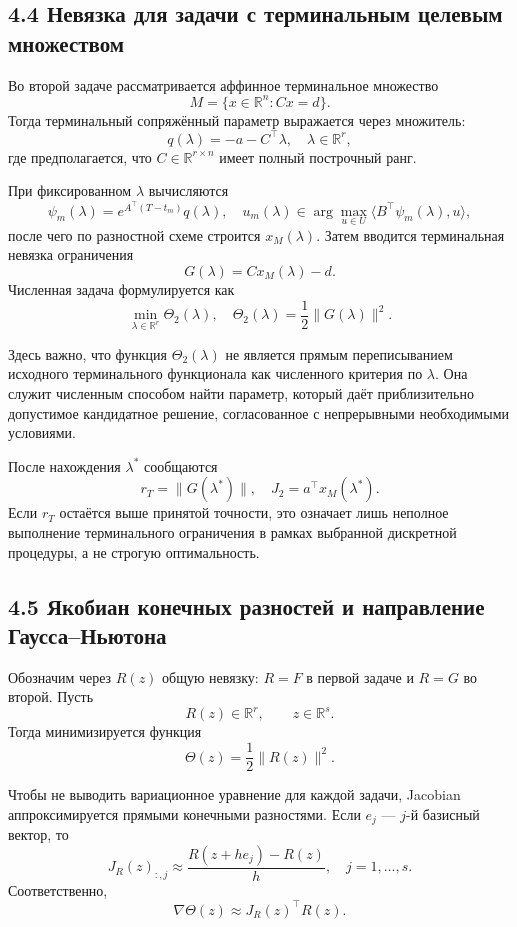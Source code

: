\documentclass[a4paper,12pt]{article}
\begin{document}
\subsection{4.4 Невязка для задачи с терминальным целевым множеством}

Во второй задаче рассматривается аффинное терминальное множество
\[
M=\{x\in\mathbb{R}^n:Cx=d\}.
\]
Тогда терминальный сопряжённый параметр выражается через множитель:
\[
q(\lambda)=-a-C^\top\lambda,\quad \lambda\in\mathbb{R}^r,
\]
где предполагается, что $C\in\mathbb{R}^{r\times n}$ имеет полный построчный ранг.

При фиксированном $\lambda$ вычисляются
\[
\psi_m(\lambda)=e^{A^\top(T-t_m)}q(\lambda),\quad
u_m(\lambda)\in\arg\max_{u\in U}\langle B^\top\psi_m(\lambda),u\rangle,
\]
после чего по разностной схеме строится $x_M(\lambda)$. Затем вводится терминальная невязка ограничения
\[
G(\lambda)=Cx_M(\lambda)-d.
\]
Численная задача формулируется как
\[
\min_{\lambda\in\mathbb{R}^r}\Theta_2(\lambda),\quad
\Theta_2(\lambda)=\frac{1}{2}\|G(\lambda)\|^2.
\]

Здесь важно, что функция $\Theta_2(\lambda)$ не является прямым переписыванием исходного терминального функционала как численного критерия по $\lambda$. Она служит численным способом найти параметр, который даёт приблизительно допустимое кандидатное решение, согласованное с непрерывными необходимыми условиями.

После нахождения $\lambda^*$ сообщаются
\[
r_T=\|G(\lambda^*)\|,\quad J_2=a^\top x_M(\lambda^*).
\]
Если $r_T$ остаётся выше принятой точности, это означает лишь неполное выполнение терминального ограничения в рамках выбранной дискретной процедуры, а не строгую оптимальность.

\subsection{4.5 Якобиан конечных разностей и направление Гаусса--Ньютона}

Обозначим через $R(z)$ общую невязку: $R=F$ в первой задаче и $R=G$ во второй. Пусть
\[
R(z)\in\mathbb{R}^r,\qquad z\in\mathbb{R}^s.
\]
Тогда минимизируется функция
\[
\Theta(z)=\frac{1}{2}\|R(z)\|^2.
\]

Чтобы не выводить вариационное уравнение для каждой задачи, Jacobian аппроксимируется прямыми конечными разностями. Если $e_j$ --- $j$-й базисный вектор, то
\[
J_R(z)_{:,j}\approx \frac{R(z+he_j)-R(z)}{h},\quad j=1,\ldots,s.
\]
Соответственно,
\[
\nabla\Theta(z)\approx J_R(z)^\top R(z).
\]
\end{document}
